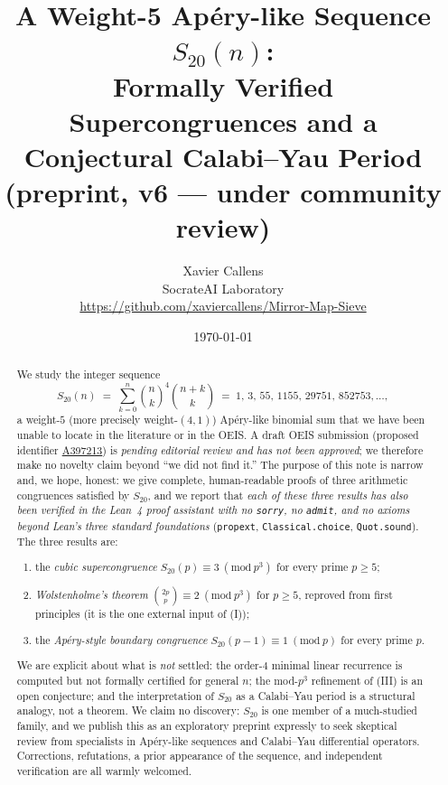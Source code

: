 \documentclass[11pt,a4paper]{article}
\title{A Weight-5 Ap\'ery-like Sequence $S_{20}(n)$:\\
  Formally Verified Supercongruences and a Conjectural Calabi--Yau Period\\
  \large (preprint, v6 --- under community review)}
\author{Xavier Callens\\
  SocrateAI Laboratory\\
  \url{https://github.com/xaviercallens/Mirror-Map-Sieve}}
\date{\today}
\theoremstyle{definition}
\theoremstyle{remark}
\newcommand{\Sx}{S_{20}}
\newcommand{\modp}[1]{\ (\mathrm{mod}\ #1)}
\begin{document}
\maketitle

\begin{abstract}
We study the integer sequence
\[
  \Sx(n) \;=\; \sum_{k=0}^{n} \binom{n}{k}^{4}\binom{n+k}{k}
  \;=\; 1,\,3,\,55,\,1155,\,29751,\,852753,\dots,
\]
a weight-$5$ (more precisely weight-$(4,1)$) Ap\'ery-like binomial sum that we
have been unable to locate in the literature or in the OEIS.  A draft OEIS
submission (proposed identifier
\href{https://oeis.org/draft/A397213}{A397213}) is \emph{pending editorial
review and has not been approved}; we therefore make no novelty claim beyond
``we did not find it.''  The purpose of this note is narrow and, we hope,
honest: we give complete, human-readable proofs of three arithmetic congruences
satisfied by $\Sx$, and we report that \emph{each of these three results has
also been verified in the Lean~4 proof assistant with no \texttt{sorry}, no
\texttt{admit}, and no axioms beyond Lean's three standard foundations}
(\texttt{propext}, \texttt{Classical.choice}, \texttt{Quot.sound}).  The three
results are:
\begin{enumerate}\itemsep0pt
  \item[(I)] the \emph{cubic supercongruence} $\Sx(p)\equiv 3 \modp{p^{3}}$ for
        every prime $p\ge 5$;
  \item[(II)] \emph{Wolstenholme's theorem} $\binom{2p}{p}\equiv 2 \modp{p^{3}}$
        for $p\ge 5$, reproved from first principles (it is the one external
        input of (I));
  \item[(III)] the \emph{Ap\'ery-style boundary congruence}
        $\Sx(p-1)\equiv 1 \modp{p}$ for every prime $p$.
\end{enumerate}
We are explicit about what is \emph{not} settled: the order-$4$ minimal linear
recurrence is computed but not formally certified for general $n$; the mod-$p^3$
refinement of (III) is an open conjecture; and the interpretation of $\Sx$ as a
Calabi--Yau period is a structural analogy, not a theorem.  We claim no
discovery: $\Sx$ is one member of a much-studied family, and we publish this as
an exploratory preprint expressly to seek skeptical review from specialists in
Ap\'ery-like sequences and Calabi--Yau differential operators.  Corrections,
refutations, a prior appearance of the sequence, and independent verification
are all warmly welcomed.
\end{abstract}
\end{document}
